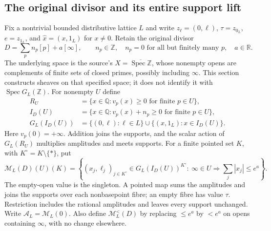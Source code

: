 \subsection{The original divisor and its entire support lift}
Fix a nontrivial bounded distributive lattice $L$ and write
$z_\ell=(0,\ell)$, $\tau=z_{0_L}$, $e=z_{1_L}$, and
$\widehat x=(x,1_L)$ for $x\ne0$. Retain the original divisor
\begin{equation}\tag{SDM1}
 D=\sum_p n_p[p]+a[\infty],\qquad n_p\in\mathbb Z,
 \quad n_p=0\text{ for all but finitely many }p,\quad a\in\mathbb R.
\end{equation}
The underlying space is the source's
$X=\overline{\operatorname{Spec}\mathbb Z}$, whose nonempty opens
are complements of finite sets of closed primes, possibly including
$\infty$. This section constructs sheaves on that specified space;
it does not identify it with $\operatorname{Spec}G_L(\mathbb Z)$.
For nonempty $U$ define
\begin{equation}\tag{SDM2}
 \begin{split}
 R_U&=\{x\in\mathbb Q:v_p(x)\ge0\text{ for finite }p\in U\},\\
 I_D(U)&=\{x\in\mathbb Q:v_p(x)+n_p\ge0\text{ for finite }p\in U\},\\
 G_L(I_D(U))&=\{(0,\ell):\ell\in L\}
           \cup\{(x,1_L):x\in I_D(U)\}.
 \end{split}
\end{equation}
Here $v_p(0)=+\infty$. Addition joins the supports, and the scalar
action of $G_L(R_U)$ multiplies amplitudes and meets supports.
For a finite pointed set $K$, with $K^\circ=K\setminus\{*\}$,
put
\begin{equation}\tag{SDM3}
 \mathcal M_L(D)(U)(K)=
 \left\{(x_j,\ell_j)_{j\in K^\circ}\in G_L(I_D(U))^{K^\circ}:
 \ \infty\in U\Longrightarrow\sum_j|x_j|\le e^a\right\}.
\end{equation}
The empty-open value is the singleton. A pointed map sums the
amplitudes and joins the supports over each nonbasepoint fibre;
an empty fibre has value $\tau$. Restriction includes the rational
amplitudes and leaves every support unchanged. Write
$\mathcal A_L=\mathcal M_L(0)$. Also define
$\mathcal M_L^{<}(D)$ by replacing $\le e^a$ by $<e^a$ on
opens containing $\infty$, with no change elsewhere.


